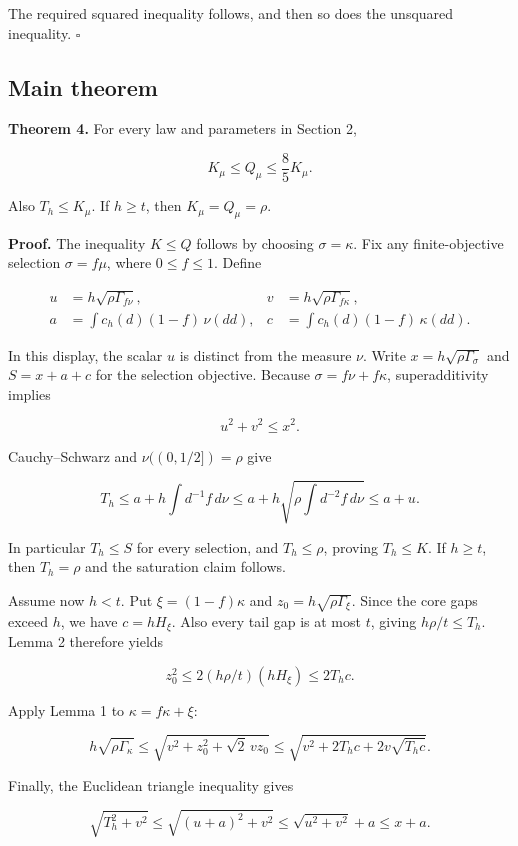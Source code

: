 \documentclass[
  11pt,
  a4paper,
]{article}
\begin{document}
The required squared inequality follows, and then so does the unsquared
inequality. \(\square\)

\subsection{Main theorem}\label{main-theorem}

\textbf{Theorem 4.} For every law and parameters in Section 2,

\[
\boxed{K_\mu\le Q_\mu\le\frac85K_\mu.}
\]

Also \(T_h\le K_\mu\). If \(h\ge t\), then \(K_\mu=Q_\mu=\rho\).

\textbf{Proof.} The inequality \(K\le Q\) follows by choosing
\(\sigma=\kappa\). Fix any finite-objective selection \(\sigma=f\mu\),
where \(0\le f\le1\). Define

\[
\begin{aligned}
u&=h\sqrt{\rho\Gamma_{f\nu}},&
v&=h\sqrt{\rho\Gamma_{f\kappa}},\\
a&=\int c_h(d)(1-f)\,\nu(dd),&
c&=\int c_h(d)(1-f)\,\kappa(dd).
\end{aligned}
\]

In this display, the scalar \(u\) is distinct from the measure \(\nu\).
Write \(x=h\sqrt{\rho\Gamma_\sigma}\) and \(S=x+a+c\) for the selection
objective. Because \(\sigma=f\nu+f\kappa\), superadditivity implies

\[
u^2+v^2\le x^2.
\]

Cauchy--Schwarz and \(\nu((0,1/2])=\rho\) give

\[
T_h\le a+h\int d^{-1}f\,d\nu
\le a+h\sqrt{\rho\int d^{-2}f\,d\nu}
\le a+u.
\]

In particular \(T_h\le S\) for every selection, and \(T_h\le\rho\),
proving \(T_h\le K\). If \(h\ge t\), then \(T_h=\rho\) and the
saturation claim follows.

Assume now \(h<t\). Put \(\xi=(1-f)\kappa\) and
\(z_0=h\sqrt{\rho\Gamma_\xi}\). Since the core gaps exceed \(h\), we
have \(c=hH_\xi\). Also every tail gap is at most \(t\), giving
\(h\rho/t\le T_h\). Lemma 2 therefore yields

\[
z_0^2\le2(h\rho/t)(hH_\xi)\le2T_hc.
\]

Apply Lemma 1 to \(\kappa=f\kappa+\xi\):

\[
h\sqrt{\rho\Gamma_\kappa}
\le\sqrt{v^2+z_0^2+\sqrt2\,vz_0}
\le\sqrt{v^2+2T_hc+2v\sqrt{T_hc}}.
\]

Finally, the Euclidean triangle inequality gives

\[
\sqrt{T_h^2+v^2}
\le\sqrt{(u+a)^2+v^2}
\le\sqrt{u^2+v^2}+a\le x+a.
\]
\end{document}
